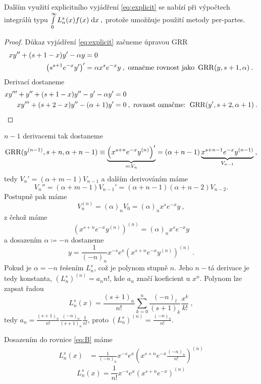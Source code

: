 Dalším využití explicitního vyjádření \ref{eq:explicit} se nabízí při výpočtech integrálů typu
$\int\limits_0^\infty L_n^s(x)f(x)\;\mathrm{d}x\:,$
protože umožňuje použití metody per-partes.
\begin{proof}
    Důkaz vyjádření \ref{eq:explicit} začneme úpravou GRR
    \begin{align*}
        xy''+(s+1-x)y'-\alpha y&=0 \\
        \left(s^{s+1}e^{-x}y'\right)' &=\alpha x^se^{-x}y\:,  \text{ označme rovnost jako }\operatorname{GRR}(y,s+1,\alpha)\:.
    \end{align*}
    Derivací dostaneme
    \begin{align*}
        xy'''+y''+(s+1-x)y''-y'-\alpha y'&=0\\
        xy'''+(s+2-x)y''-(\alpha+1)y'&=0\:, \text{ rovnost označme: } \operatorname{GRR}(y',s+2,\alpha+1)\:.
    \end{align*}
\end{proof}
$n-1$ derivacemi tak dostaneme
$$\operatorname{GRR}(y^{(n-1)},s+n,\alpha+n-1) \equiv \underbrace{\left(x^{s+n}e^{-x}y^{(n)}\right)'}_{\eqqcolon V_n} = (\alpha+n-1)\underbrace{x^{s+n-1}e^{-x}y^{(n-1)}}_{V_{n-1}}\:,$$
tedy $V_n'=(\alpha+m-1)V_{n-1}$ a dalším derivováním máme
$$V_n''=(\alpha+m-1)V_{n-1}' = (\alpha+n-1)(\alpha+n-2)V_{n-2}.$$
Postupně pak máme
$$V_n^{(n)}=(\alpha)_nV_0 = (\alpha)_nx^se^{-x}y\:,$$
z čehož máme
$$\left(x^{s+n}e^{-x}y^{(n)}\right)^{(n)} = (\alpha)_nx^se^{-x}y$$
a dosazením $\alpha\coloneqq -n$ dostaneme
\begin{equation}
    y = \frac{1}{(-n)_n}x^{-s}e^x\left(x^{s+n}e^{-x}y^{(n)}\right)^{(n)}\:.
    \label{eq:B}
\end{equation}
Pokud je $\alpha=-n$ řešením $L^s_n$, což je polynom stupně $n$. Jeho $n-$tá derivace je tedy konstanta, $(L_n^s)^{(n)}=a_n n!$, kde $a_n$ značí koeficient u $x^n$. Polynom lze zapsat řadou
$$L_n^s(x) = \frac{(s+1)_n}{n!}\sum\limits_{k=0}^n\frac{(-n)_l}{(s+1)_k}\frac{x^k}{k!}\:,$$
tedy $a_n = \frac{(s+1)_n}{n!}\frac{(-n)_n}{(s+1)_n}\frac{1}{n!}$, proto $(L_n^s)^{(n)} = \frac{(-n)_n}{n!}$.

Dosazením do rovnice \ref{eq:B} máme
\begin{align*}
    L_n^s(x)&=\frac{1}{(-n)_n}x^{-s}e^x\left(x^{s+n}e^{-x}\frac{(-n)_n}{n!}\right)^{(n)}
\end{align*}
\begin{equation}
    L^s_n(x) =\frac{1}{n!}x^{-s}e^x\left(x^{s+n}e^{-x}\right)^{(n)}
    \label{eq:C_dukazend}
\end{equation}


